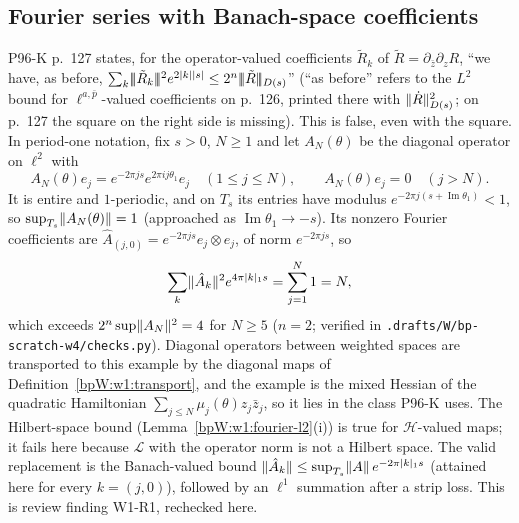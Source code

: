 \subsection{Fourier series with Banach-space coefficients}\label{bpW:w4:fourier-sec}

\begin{remark}\label{bpW:w4:counterexample}
P96-K p.~127 states, for the operator-valued coefficients $\tilde R_k$ of $\tilde R=\partial_{\bar z}\partial_zR$,
``we have, as before, $\sum_k\abs{\!\abs{\!\abs{\tilde R_k}\!}\!}^2e^{2\abs k\abs s}\le2^n\abs{\!\abs{\!\abs{\tilde R}\!}\!}_{D(s)}$''
(``as before'' refers to the $L^2$ bound for $\ell^{a,\bar p}$-valued coefficients on p.~126, printed there with
$\lVert \dot R\rVert^2_{D(s)}$; on p.~127 the square on the right side is missing). This is false, even with the square. In period-one notation, fix $s>0$, $N\ge1$ and let
$A_N(\theta)$ be the diagonal operator on $\ell^2$ with
\[A_N(\theta)e_j=e^{-2\pi js}e^{2\pi ij\theta_1}e_j\quad(1\le j\le N),\qquad A_N(\theta)e_j=0\quad(j>N).\]
It is entire and $1$-periodic, and on $T_s$ its entries have modulus $e^{-2\pi j(s+\operatorname{Im}\theta_1)}<1$, so
$\sup_{T_s}\lVert A_N(\theta)\rVert=1$ (approached as $\operatorname{Im}\theta_1\to-s$). Its nonzero Fourier coefficients
are $\hat A_{(j,0)}=e^{-2\pi js}e_j\otimes e_j$, of norm $e^{-2\pi js}$, so
\[\sum_k\lVert \hat A_k\rVert^2e^{4\pi\lvert k\rvert_1s}=\sum_{j=1}^N1=N,\]
which exceeds $2^n\sup\lVert A_N\rVert^2=4$ for $N\ge5$ ($n=2$; verified in
\texttt{.drafts/W/bp-scratch-w4/checks.py}). Diagonal operators between weighted spaces are transported to this
example by the diagonal maps of Definition~\ref{bpW:w1:transport}, and the example is the mixed Hessian of the quadratic
Hamiltonian $\sum_{j\le N}\mu_j(\theta)z_j\bar z_j$, so it lies in the class P96-K uses. The Hilbert-space bound
(Lemma~\ref{bpW:w1:fourier-l2}(i)) is true for $\mathcal H$-valued maps; it fails here because $\mathcal L$ with the
operator norm is not a Hilbert space. The valid replacement is the Banach-valued bound
$\lVert \hat A_k\rVert\le\sup_{T_s}\lVert A\rVert\,e^{-2\pi\lvert k\rvert_1s}$ (attained here for every $k=(j,0)$), followed by an
$\ell^1$ summation after a strip loss. This is review finding W1-R1, rechecked here.
\end{remark}

